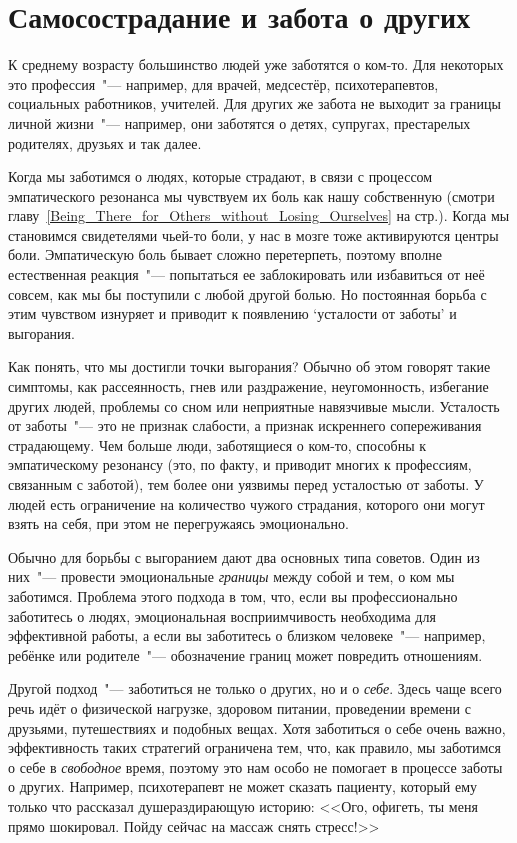 
\chapter{Самосострадание и забота о других} \label{Self-Compassion_for_Caregivers}

К среднему возрасту большинство людей уже заботятся о ком-то. Для некоторых это профессия~"--- например, для врачей, медсестёр, психотерапевтов, социальных работников, учителей. Для других же забота не выходит за границы личной жизни~"--- например, они заботятся о детях, супругах, престарелых родителях, друзьях и так далее.

Когда мы заботимся о людях, которые страдают, в связи с процессом эмпатического резонанса мы чувствуем их боль как нашу собственную (смотри главу~\ref{Being_There_for_Others_without_Losing_Ourselves} на стр.\:\pageref{Being_There_for_Others_without_Losing_Ourselves}). Когда мы становимся свидетелями чьей-то боли, у нас в мозге тоже активируются центры боли\cite{99}. Эмпатическую боль бывает сложно перетерпеть, поэтому вполне естественная реакция~"--- попытаться ее заблокировать или избавиться от неё совсем, как мы бы поступили с любой другой болью. Но постоянная борьба с этим чувством изнуряет и приводит к появлению ‘усталости от заботы’ и выгорания.

Как понять, что мы достигли точки выгорания? Обычно об этом говорят такие симптомы, как рассеянность, гнев или раздражение, неугомонность, избегание других людей, проблемы со сном или неприятные навязчивые мысли\cite{100}. Усталость от заботы~"--- это не признак слабости, а признак искреннего сопереживания страдающему. Чем больше люди, заботящиеся о ком-то, способны к эмпатическому резонансу (это, по факту, и приводит многих к профессиям, связанным с заботой), тем более они уязвимы перед усталостью от заботы\cite{101}. У людей есть ограничение на количество чужого страдания, которого они могут взять на себя, при этом не перегружаясь эмоционально.

Обычно для борьбы с выгоранием дают два основных типа советов. Один из них~"--- провести эмоциональные \emph{границы} между собой и тем, о ком мы заботимся. Проблема этого подхода в том, что, если вы профессионально заботитесь о людях, эмоциональная восприимчивость необходима для эффективной работы, а если вы заботитесь о близком человеке~"--- например, ребёнке или родителе~"--- обозначение границ может повредить отношениям. 

Другой подход~"--- заботиться не только о других, но и о \emph{себе}. Здесь чаще всего речь идёт о физической нагрузке, здоровом питании, проведении времени с друзьями, путешествиях и подобных вещах. Хотя заботиться о себе очень важно, эффективность таких стратегий ограничена тем, что, как правило, мы заботимся о себе в \emph{свободное} время, поэтому это нам особо не помогает в процессе заботы о других. Например,  психотерапевт не может сказать пациенту, который ему только что рассказал душераздирающую историю: <<Ого, офигеть, ты меня прямо шокировал. Пойду сейчас на массаж снять стресс!>>

